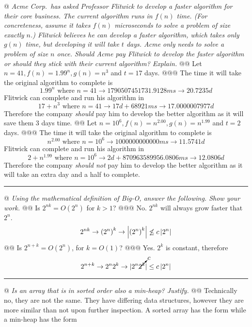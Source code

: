 \documentclass[10pt]{article}
\begin{document}
\begin{easylist}[enumerate]
    @ \textit{Acme Corp.\ has asked Professor Flitwick to develop a faster algorithm for their core business. The current algorithm runs in $f(n)$ time. (For concreteness, assume it takes $f(n)$ microseconds to solve a problem of size exactly $n$.) Flitwick believes he can develop a faster algorithm, which takes only $g(n)$ time, but developing it will take $t$ days. Acme only needs to solve a problem of size $n$ once. Should Acme pay Flitwick to develop the faster algorithm or should they stick with their current algorithm? Explain.}
    @@ Let $n = 41, f (n) = 1.99^n , g(n) = n^3$ and $t = 17$ days.
    @@@ The time it will take the original algorithm to complete is
        \[ 1.99^n \text{ where } n=41 \to 1790507451731.9128 ms \to 20.7235 d \]
        Flitwick can complete and run his algorithm in
        \[ 17 + n^3 \text{ where } n=41 \to 17 d + 68921 ms \to 17.0000007977 d \]
        Therefore the company \textit{should} pay him to develop the better algorithm as it will save them 3 days time.
    @@ Let $n = 10^6 , f (n) = n^{2.00} , g(n) = n^{1.99}$ and $t = 2$ days.
    @@@ The time it will take the original algorithm to complete is
        \[ n^{2.00} \text{ where } n=10^6 \to 1000000000000 ms \to 11.5741 d \]
        Flitwick can complete and run his algorithm in
        \[ 2 + n^{1.99} \text{ where } n=10^6 \to 2 d + 870963589956.0806 ms \to 12.0806 d \]
        Therefore the company \textit{should not} pay him to develop the better algorithm as it will take an extra day and a half to complete.

    \rule{3in}{0.5pt}

    @ \textit{Using the mathematical definition of Big-O, answer the following. Show your work.}
    @@ Is $2^{nk} = O(2^n)$ for $k > 1$?
    @@@ No. $2^{nk}$ will always grow faster that $2^n$.
        \[ 2^{nk} \to {(2^n)}^k \to \left\lvert  {(2^n)}^k \right\rvert \not\le c \left\lvert 2^n \right\rvert \]
    @@ Is $2^{n+k} = O(2^n)$, for $k = O(1)$?
    @@@ Yes. $2^k$ is constant, therefore
        \[ 2^{n+k} \to 2^n 2^k \to \vert {2^n \cancelto{c}{2^k} } \vert \le c \left\lvert 2^n \right\rvert \]

    \rule{3in}{0.5pt}

    @ \textit{Is an array that is in sorted order also a min-heap? Justify.}
    @@ Technically no, they are not the same. They have differing data structures, however they are more similar than not upon further inspection. A sorted array has the form {\ttfamily [1, 2, 3, 4, 5]} while a min-heap has the form


\end{easylist}
\end{document}
